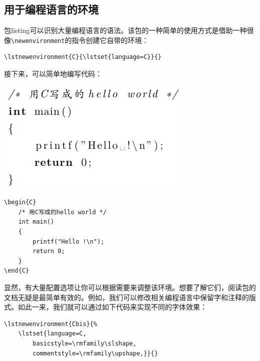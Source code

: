 \subsection{用于编程语言的环境}

包\textsf{listing}可以识别大量编程语言的语法。该包的一种简单的使用方式是借助一种很像\verb|\newenvironment|的指令创建它自带的环境：

\begin{dmd}
\begin{verbatim}
\lstnewenvironment{C}{\lstset{language=C}}{}
\end{verbatim}
\end{dmd}

接下来，可以简单地编写代码：


\begin{codelist}[10.7]{
\includegraphics{texs/chelloworld1}
}\begin{verbatim}
\begin{C}
    /* 用C写成的hello world */
    int main()
    {
        printf("Hello !\n");
        return 0;
    }
\end{C}
\end{verbatim}
\end{codelist}

显然，有大量配置选项让你可以根据需要来调整该环境。想要了解它们，阅读包的文档无疑是最简单有效的。例如，我们可以修改相关编程语言中保留字和注释的版式。如此一来，我们就可以通过如下代码来实现不同的字体效果：

\begin{dmd}
\begin{verbatim}
\lstnewenvironment{Cbis}{% 
    \lstset{language=C,
        basicstyle=\rmfamily\slshape,
        commentstyle=\rmfamily\upshape,}}{}
\end{verbatim}
\end{dmd}

